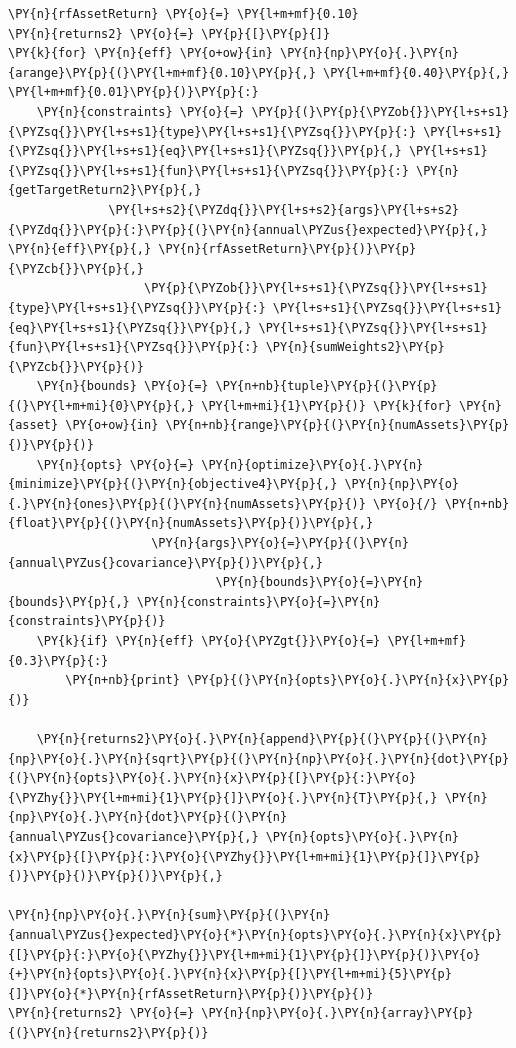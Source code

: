 \begin{tcolorbox}[breakable, size=fbox, boxrule=1pt, pad at break*=1mm,colback=cellbackground, colframe=cellborder]
\begin{Verbatim}[commandchars=\\\{\}]
\PY{n}{rfAssetReturn} \PY{o}{=} \PY{l+m+mf}{0.10}
\PY{n}{returns2} \PY{o}{=} \PY{p}{[}\PY{p}{]}
\PY{k}{for} \PY{n}{eff} \PY{o+ow}{in} \PY{n}{np}\PY{o}{.}\PY{n}{arange}\PY{p}{(}\PY{l+m+mf}{0.10}\PY{p}{,} \PY{l+m+mf}{0.40}\PY{p}{,} \PY{l+m+mf}{0.01}\PY{p}{)}\PY{p}{:}
    \PY{n}{constraints} \PY{o}{=} \PY{p}{(}\PY{p}{\PYZob{}}\PY{l+s+s1}{\PYZsq{}}\PY{l+s+s1}{type}\PY{l+s+s1}{\PYZsq{}}\PY{p}{:} \PY{l+s+s1}{\PYZsq{}}\PY{l+s+s1}{eq}\PY{l+s+s1}{\PYZsq{}}\PY{p}{,} \PY{l+s+s1}{\PYZsq{}}\PY{l+s+s1}{fun}\PY{l+s+s1}{\PYZsq{}}\PY{p}{:} \PY{n}{getTargetReturn2}\PY{p}{,} 
    		  \PY{l+s+s2}{\PYZdq{}}\PY{l+s+s2}{args}\PY{l+s+s2}{\PYZdq{}}\PY{p}{:}\PY{p}{(}\PY{n}{annual\PYZus{}expected}\PY{p}{,} \PY{n}{eff}\PY{p}{,} \PY{n}{rfAssetReturn}\PY{p}{)}\PY{p}{\PYZcb{}}\PY{p}{,}
                   \PY{p}{\PYZob{}}\PY{l+s+s1}{\PYZsq{}}\PY{l+s+s1}{type}\PY{l+s+s1}{\PYZsq{}}\PY{p}{:} \PY{l+s+s1}{\PYZsq{}}\PY{l+s+s1}{eq}\PY{l+s+s1}{\PYZsq{}}\PY{p}{,} \PY{l+s+s1}{\PYZsq{}}\PY{l+s+s1}{fun}\PY{l+s+s1}{\PYZsq{}}\PY{p}{:} \PY{n}{sumWeights2}\PY{p}{\PYZcb{}}\PY{p}{)}
    \PY{n}{bounds} \PY{o}{=} \PY{n+nb}{tuple}\PY{p}{(}\PY{p}{(}\PY{l+m+mi}{0}\PY{p}{,} \PY{l+m+mi}{1}\PY{p}{)} \PY{k}{for} \PY{n}{asset} \PY{o+ow}{in} \PY{n+nb}{range}\PY{p}{(}\PY{n}{numAssets}\PY{p}{)}\PY{p}{)}
    \PY{n}{opts} \PY{o}{=} \PY{n}{optimize}\PY{o}{.}\PY{n}{minimize}\PY{p}{(}\PY{n}{objective4}\PY{p}{,} \PY{n}{np}\PY{o}{.}\PY{n}{ones}\PY{p}{(}\PY{n}{numAssets}\PY{p}{)} \PY{o}{/} \PY{n+nb}{float}\PY{p}{(}\PY{n}{numAssets}\PY{p}{)}\PY{p}{,} 
    			    \PY{n}{args}\PY{o}{=}\PY{p}{(}\PY{n}{annual\PYZus{}covariance}\PY{p}{)}\PY{p}{,}
                             \PY{n}{bounds}\PY{o}{=}\PY{n}{bounds}\PY{p}{,} \PY{n}{constraints}\PY{o}{=}\PY{n}{constraints}\PY{p}{)}
    \PY{k}{if} \PY{n}{eff} \PY{o}{\PYZgt{}}\PY{o}{=} \PY{l+m+mf}{0.3}\PY{p}{:}
        \PY{n+nb}{print} \PY{p}{(}\PY{n}{opts}\PY{o}{.}\PY{n}{x}\PY{p}{)}

    \PY{n}{returns2}\PY{o}{.}\PY{n}{append}\PY{p}{(}\PY{p}{(}\PY{n}{np}\PY{o}{.}\PY{n}{sqrt}\PY{p}{(}\PY{n}{np}\PY{o}{.}\PY{n}{dot}\PY{p}{(}\PY{n}{opts}\PY{o}{.}\PY{n}{x}\PY{p}{[}\PY{p}{:}\PY{o}{\PYZhy{}}\PY{l+m+mi}{1}\PY{p}{]}\PY{o}{.}\PY{n}{T}\PY{p}{,} \PY{n}{np}\PY{o}{.}\PY{n}{dot}\PY{p}{(}\PY{n}{annual\PYZus{}covariance}\PY{p}{,} \PY{n}{opts}\PY{o}{.}\PY{n}{x}\PY{p}{[}\PY{p}{:}\PY{o}{\PYZhy{}}\PY{l+m+mi}{1}\PY{p}{]}\PY{p}{)}\PY{p}{)}\PY{p}{)}\PY{p}{,} 
                    
\PY{n}{np}\PY{o}{.}\PY{n}{sum}\PY{p}{(}\PY{n}{annual\PYZus{}expected}\PY{o}{*}\PY{n}{opts}\PY{o}{.}\PY{n}{x}\PY{p}{[}\PY{p}{:}\PY{o}{\PYZhy{}}\PY{l+m+mi}{1}\PY{p}{]}\PY{p}{)}\PY{o}{+}\PY{n}{opts}\PY{o}{.}\PY{n}{x}\PY{p}{[}\PY{l+m+mi}{5}\PY{p}{]}\PY{o}{*}\PY{n}{rfAssetReturn}\PY{p}{)}\PY{p}{)}
\PY{n}{returns2} \PY{o}{=} \PY{n}{np}\PY{o}{.}\PY{n}{array}\PY{p}{(}\PY{n}{returns2}\PY{p}{)}
\end{Verbatim}
\end{tcolorbox}

